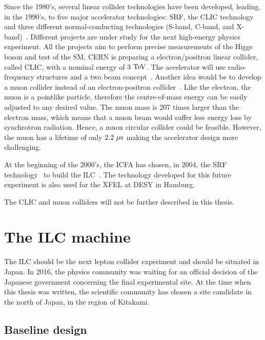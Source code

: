     Since the 1980's, several linear collider technologies have been developed, leading, in the 1990's, to five major accelerator technologies: \gls{SRF}, the \gls{CLIC} technology and three different normal-conducting technologies (S-band, C-band, and X-band)~\cite{Desy1988}.
    Different projects are under study for the next high-energy physics experiment. 
    All the projects aim to perform precise measurements of the Higgs boson and test of the \gls{SM}.
    CERN is preparing a electron/positron linear collider, called \gls{CLIC}, with a nominal energy of $3~\rm{TeV}$.
    The accelerator will use radio-frequency structures and a two beam concept~\cite{CLIC}.
    Another idea would be to develop a muon collider instead of an electron-positron collider~\cite{Lipton2012}.
    Like the electron, the muon is a pointlike particle, therefore the centre-of-mass energy can be easily adjusted to any desired value.
    The muon mass is 207 times larger than the electron mass, which means that a muon beam would suffer less energy loss by synchrotron radiation.
    Hence, a muon circular collider could be feasible.
    However, the muon has a lifetime of only $2.2~\rm{\mu s}$ making the accelerator design more challenging.
 
    At the beginning of the 2000's, the \gls{ICFA} has chosen, in 2004, the \gls{SRF} technology~\cite{ICFA2004} to build the \gls{ILC}~\cite{ILC}.
    The technology developed for this future experiment is also used for the XFEL at \gls{DESY} in Hamburg.%
        
    The \gls{CLIC} and muon colliders will not be further described in this thesis.
     
  \section{The ILC machine}
  
    The \gls{ILC} should be the next lepton collider experiment and should be situated in Japan.
    In 2016, the physics community was waiting for an official decision of the Japanese government concerning the final experimental site.
    At the time when this thesis was written, the scientific community has chosen a site candidate in the north of Japan, in the region of Kitakami. 
    
    \subsection{Baseline design}

